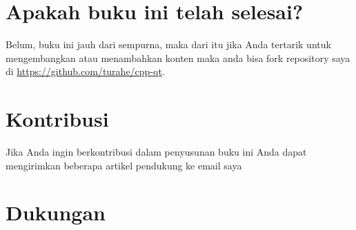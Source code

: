\section*{Apakah buku ini telah selesai?}

Belum, buku ini jauh dari sempurna, maka dari itu jika Anda tertarik 
untuk mengembangkan atau menambahkan konten maka anda bisa fork repository
saya di \url{https://github.com/turahe/cpp-qt}.

\section*{Kontribusi}

Jika Anda ingin berkontribusi dalam penyusunan buku ini Anda dapat
mengirimkan beberapa artikel pendukung ke email saya 

\section*{Dukungan}

